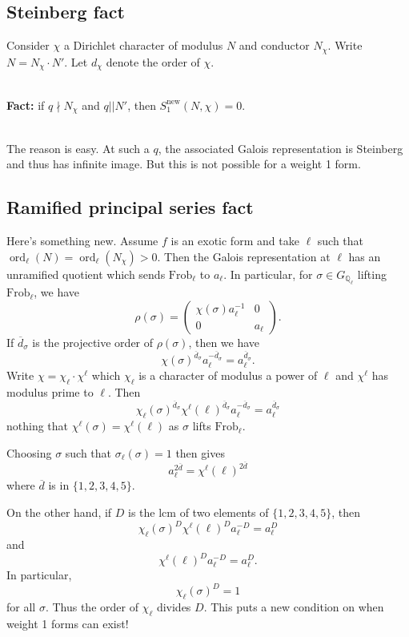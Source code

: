 \documentclass[11pt]{amsart}
\theoremstyle{plain}
\theoremstyle{definition}
\newcommand{\Q}{{\mathbb Q}}
\DeclareMathOperator{\ord}{ord}
\DeclareMathOperator{\new}{new}
\newcommand{\Frob}{\text{Frob}}
\renewcommand{\[}{\left[}
\renewcommand{\]}{\right]}
\begin{document}
\subsection{Steinberg fact}
Consider $\chi$ a Dirichlet character of modulus $N$ and conductor $N_\chi$.  Write $N = N_\chi \cdot N'$.  Let $d_\chi$ denote the order of $\chi$.

~\\

\noindent
{\bf Fact:} if $q \nmid N_\chi$ and $q || N'$, then $S_1^{\new}(N,\chi) = 0$.  

~\\

The reason is easy.  At such a $q$, the associated Galois representation is Steinberg and thus has infinite image.  But this is not possible for a weight 1 form.

\subsection{Ramified principal series fact}

Here's something new.  Assume $f$ is an exotic form and take $\ell$ such that $\ord_
\ell(N) = \ord_\ell(N_\chi) >0$.  Then the Galois representation at $\ell$ has an unramified quotient which sends $\Frob_\ell$ to $a_\ell$.  In particular, for $\sigma \in G_{\Q_\ell}$ lifting $\Frob_\ell$, we have
$$
\rho(\sigma) = 
\begin{pmatrix}
\chi(\sigma) a_\ell^{-1} & 0 \\
0 & a_\ell
\end{pmatrix}.
$$
If $\overline{d}_\sigma$ is the projective order of $\rho(\sigma)$, then we have 
$$
\chi(\sigma)^{\overline{d}_\sigma} a_\ell^{-\overline{d}_\sigma} = a_\ell^{\overline{d}_\sigma}.
$$
Write $\chi = \chi_\ell \cdot \chi^{\ell}$ which $\chi_\ell$ is a character of modulus a power of $\ell$ and $\chi^{\ell}$ has modulus prime to $\ell$.  Then 
$$
\chi_\ell(\sigma)^{\overline{d}_\sigma} \chi^\ell(\ell)^{\overline{d}_\sigma}  a_\ell^{-\overline{d}_\sigma} = a_\ell^{\overline{d}_\sigma}
$$
nothing that $\chi^\ell(\sigma) = \chi^\ell(\ell)$ as $\sigma$ lifts $\Frob_\ell$.

Choosing $\sigma$ such that $\sigma_\ell(\sigma) = 1$ then gives
$$
a_\ell^{2 \overline{d}} = \chi^{\ell}(\ell)^{2\overline{d}}
$$
where $\overline{d}$ is in $\{1,2,3,4,5\}$.

On the other hand, if $D$ is the lcm of two elements of $\{1,2,3,4,5\}$, then 
$$
\chi_\ell(\sigma)^D \chi^\ell(\ell)^D  a_\ell^{-D} = a_\ell^D
$$
and
$$
\chi^\ell(\ell)^D  a_\ell^{-D} = a_\ell^D.
$$
In particular,
$$
\chi_\ell(\sigma)^D = 1
$$
for all $\sigma$.  Thus the order of $\chi_\ell$ divides $D$.  This puts a new condition on when weight 1 forms can exist!
\end{document}
